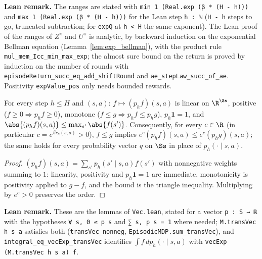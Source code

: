 \textbf{Lean remark.} The ranges are stated with \texttt{min 1 (Real.exp (β * (H - h)))} and
\texttt{max 1 (Real.exp (β * (H - h)))} for the Lean step \texttt{h : ℕ} (\texttt{H - h} steps to
go, truncated subtraction; for \texttt{expQ} at \texttt{h < H} the same exponent). The
Lean proof of the ranges of $Z^\pi$ and $U^\pi$ is analytic, by backward induction on the
exponential Bellman equation (Lemma~\ref{lem:exp_bellman}), with the product rule
\texttt{mul\_mem\_Icc\_min\_max\_exp}; the almost sure bound on the return is proved by
induction on the number of rounds with \texttt{episodeReturn\_succ\_eq\_add\_shiftRound} and
\texttt{ae\_stepLaw\_succ\_of\_ae}. Positivity \texttt{expValue\_pos} only needs bounded rewards.

\begin{lemma}\label{lem:exp_value_monotone}
\leanok
{}
For every step $h \le H$ and $(s, a)$: $f \mapsto (p_h f)(s, a)$ is linear on $\R^{\Ss}$,
positive ($f \ge 0 \Rightarrow p_h f \ge 0$), monotone ($f \le g \Rightarrow p_h f \le p_h g$),
$p_h \mathbf 1 = 1$, and $\abs{(p_h f)(s, a)} \le \max_{s'} \abs{f(s')}$. Consequently, for every
$c \in \R$ (in particular $c = e^{\beta r_h(s, a)} > 0$), $f \le g$ implies
$e^{c}(p_h f)(s, a) \le e^{c}(p_h g)(s, a)$; the same holds for every probability vector $q$ on
$\Ss$ in place of $p_h(\cdot \mid s, a)$.
\end{lemma}

\begin{proof}
\leanok
$(p_h f)(s, a) = \sum_{s'} p_h(s' \mid s, a) f(s')$ with nonnegative weights summing to $1$:
linearity, positivity and $p_h \mathbf 1 = 1$ are immediate, monotonicity is positivity applied
to $g - f$, and the bound is the triangle inequality. Multiplying by $e^c > 0$ preserves the
order.
\end{proof}

\textbf{Lean remark.} These are the lemmas of \texttt{Vec.lean}, stated for a vector
\texttt{p : S → ℝ} with the hypotheses \texttt{∀ s, 0 ≤ p s} and \texttt{∑ s, p s = 1} where
needed; \texttt{M.transVec h s a} satisfies both (\texttt{transVec\_nonneg},
\texttt{EpisodicMDP.sum\_transVec}), and \texttt{integral\_eq\_vecExp\_transVec} identifies
$\int f\,dp_h(\cdot \mid s, a)$ with \texttt{vecExp (M.transVec h s a) f}.

